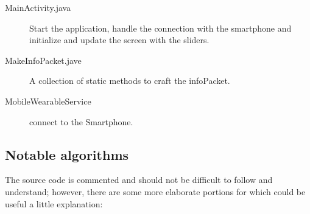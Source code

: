 \documentclass[../main.tex]{subfiles}
\begin{document}
\begin{description}
	\item[MainActivity.java] Start the application, handle the connection with the smartphone and initialize and update the screen with the sliders.
	\item[MakeInfoPacket.jave] A collection of static methods to craft the infoPacket.
	\item[MobileWearableService] connect to the Smartphone.
\end{description}

\subsection{Notable algorithms}

The source code is commented and should not be difficult to follow and understand; however, there are some more elaborate portions for which could be useful a little explanation:
\end{document}
